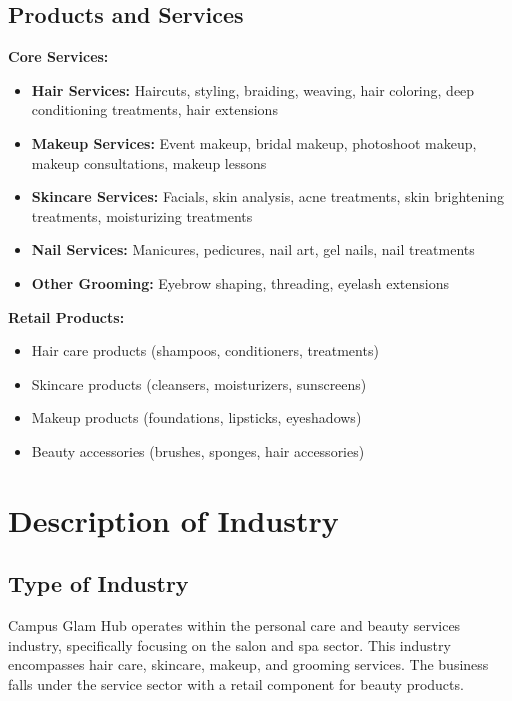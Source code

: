 \documentclass[a4paper,12pt]{article}
\begin{document}
\subsection{Products and Services}

\textbf{Core Services:}
\begin{itemize}[leftmargin=2em]
    \item \textbf{Hair Services:} Haircuts, styling, braiding, weaving, hair coloring, deep conditioning treatments, hair extensions
    \item \textbf{Makeup Services:} Event makeup, bridal makeup, photoshoot makeup, makeup consultations, makeup lessons
    \item \textbf{Skincare Services:} Facials, skin analysis, acne treatments, skin brightening treatments, moisturizing treatments
    \item \textbf{Nail Services:} Manicures, pedicures, nail art, gel nails, nail treatments
    \item \textbf{Other Grooming:} Eyebrow shaping, threading, eyelash extensions
\end{itemize}

\textbf{Retail Products:}
\begin{itemize}[leftmargin=2em]
    \item Hair care products (shampoos, conditioners, treatments)
    \item Skincare products (cleansers, moisturizers, sunscreens)
    \item Makeup products (foundations, lipsticks, eyeshadows)
    \item Beauty accessories (brushes, sponges, hair accessories)
\end{itemize}

\newpage
\section{Description of Industry}

\subsection{Type of Industry}

Campus Glam Hub operates within the personal care and beauty services industry, specifically focusing on the salon and spa sector. This industry encompasses hair care, skincare, makeup, and grooming services. The business falls under the service sector with a retail component for beauty products.
\end{document}
